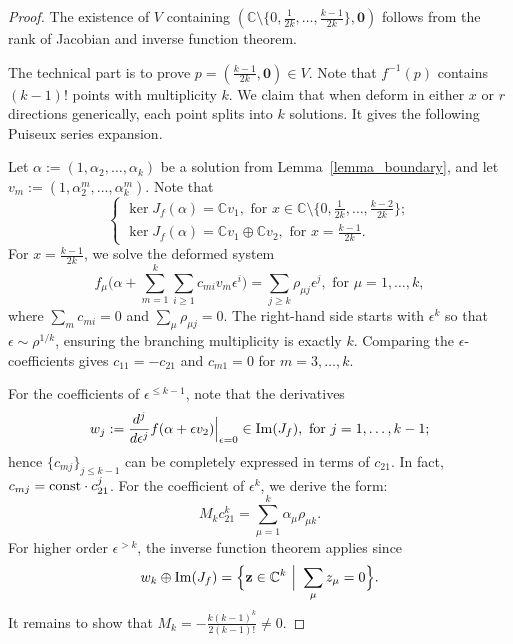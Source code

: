 \documentclass[11pt]{amsart}
\theoremstyle{remark}
\numberwithin{equation}{section}
\begin{document}
\begin{proof}
The existence of $V$ containing $(\mathbb{C} \setminus \{ 0, \frac{1}{2k}, \dots, \frac{k-1}{2k} \}, \mathbf{0})$ follows from the rank of Jacobian and inverse function theorem. 

The technical part is to prove $p = ( \frac{k-1}{2k} , \mathbf{0} ) \in V$. Note that $f^{-1}(p)$ contains $(k-1)!$ points with multiplicity $k$. We claim that when deform in either $x$ or $r$ directions generically, each point splits into $k$ solutions. It gives the following Puiseux series expansion. 

Let $\alpha := (1, \alpha_2, \dots, \alpha_k)$ be a solution from Lemma~\ref{lemma_boundary}, and let $v_m := (1, \alpha_2^m,\dots,\alpha_k^m)$. Note that 
\[
\begin{cases}
    \ker J_f(\alpha) = \mathbb{C} v_1, \text{ for }x\in \mathbb{C} \setminus\{0, \frac{1}{2k}, \dots, \frac{k-2}{2k}\};
    \\
    \ker J_f(\alpha) = \mathbb{C} v_1 \oplus \mathbb{C} v_2,  \text{ for }x= \frac{k-1}{2k}.
\end{cases}
\]
For $x = \frac{k-1}{2k}$, we solve the deformed system
\[
    f_\mu \Big( \alpha + \sum_{m=1}^k\sum_{i \geq 1} c_{m i} v_m \epsilon^i\Big) = \sum_{j \geq k} \rho_{\mu j} \epsilon^j, \text{ for }\mu=1,\dots,k,
\]
where $\sum_m c_{m i} = 0$ and $\sum_{\mu} \rho_{\mu j}=0$. The right-hand side starts with $\epsilon^k$ so that $\epsilon \sim \rho^{1/k}$, ensuring the branching multiplicity is exactly $k$. Comparing the $\epsilon$-coefficients gives $c_{11} = -c_{21}$ and $c_{m 1} =0$ for $m=3,\dots,k$. 

For the coefficients of $\epsilon^{\leq k-1}$, note that the derivatives 
\[
    w_j := \frac{d^j}{d\epsilon^j} f(\alpha + \epsilon v_2)\Big|_{\epsilon=0} \in {\rm Im}(J_f), \text{ for }j=1,\dots,k-1;
\]
hence $\{ c_{m j} \}_{ j \leq k-1 }$ can be completely expressed in terms of $c_{21}$. In fact, $c_{m j} = {\rm const} \cdot c_{21}^j$. For the coefficient of $\epsilon^k$, we derive the form:
\[
    M_k c_{21}^k = \sum_{\mu =1}^k \alpha_\mu  \rho_{\mu k}.  
\]
For higher order $\epsilon^{>k}$, the inverse function theorem applies since
\[
    w_k \oplus {\rm Im}(J_f) = \Big\{ \mathbf{z} \in \mathbb{C}^k \ \Big| \ \sum_\mu z_\mu=0  \Big\}.
\]
It remains to show that $M_k = - \frac{k(k-1)^k}{2(k-1)!} \neq 0$. 


\end{proof}
\end{document}
